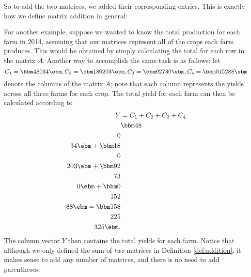 So to add the two matrices, we added their corresponding entries. This is exactly how we define matrix addition in general:

\smallskip


\smallskip

For another example, suppose we wanted to know the total production for each farm in 2014, assuming that our matrices represent all of the crops each farm produces. This would be obtained by simply calculating the total for each row in the matrix $A$. Another way to accomplish the same task is as follows: let
\[
C_1 = \bbm 48\\0\\34\ebm, C_2 = \bbm 18\\0\\203\ebm, C_3 = \bbm 92\\73\\0\ebm, C_4 = \bbm 0\\152\\88\ebm
\]
denote the columns of the matrix $A$; note that each column represents the yields across all three farms for each crop. The total yield for each farm can then be calculated according to
\begin{align*}
Y & = C_1+C_2+C_3+C_4\\
 & \bbm 48\\0\\34\ebm + \bbm 18\\0\\203\ebm + \bbm 92\\73\\0\ebm + \bbm 0\\152\\88\ebm = \bbm 158\\225\\325\ebm.
\end{align*}
The column vector $Y$ then contains the total yields for each farm. Notice that although we only defined the sum of \textit{two} matrices in Definition \ref{def:addition}, it makes sense to add any number of matrices, and there is no need to add parentheses.

